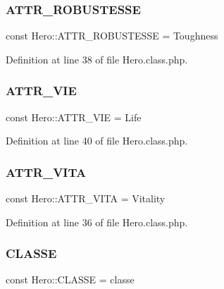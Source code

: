 \subsubsection{\texorpdfstring{A\+T\+T\+R\+\_\+\+R\+O\+B\+U\+S\+T\+E\+S\+SE}{ATTR\_ROBUSTESSE}}
{\footnotesize\ttfamily const Hero\+::\+A\+T\+T\+R\+\_\+\+R\+O\+B\+U\+S\+T\+E\+S\+SE = \textquotesingle{}Toughness\textquotesingle{}}



Definition at line 38 of file Hero.\+class.\+php.

\mbox{\label{class_hero_ac12926c2f7d9d0ad91ee3956de0e4471}} 
\subsubsection{\texorpdfstring{A\+T\+T\+R\+\_\+\+V\+IE}{ATTR\_VIE}}
{\footnotesize\ttfamily const Hero\+::\+A\+T\+T\+R\+\_\+\+V\+IE = \textquotesingle{}Life\textquotesingle{}}



Definition at line 40 of file Hero.\+class.\+php.

\mbox{\label{class_hero_a5d896e1773903e8496b01bff06bcdd62}} 
\subsubsection{\texorpdfstring{A\+T\+T\+R\+\_\+\+V\+I\+TA}{ATTR\_VITA}}
{\footnotesize\ttfamily const Hero\+::\+A\+T\+T\+R\+\_\+\+V\+I\+TA = \textquotesingle{}Vitality\textquotesingle{}}



Definition at line 36 of file Hero.\+class.\+php.

\mbox{\label{class_hero_a261b3cd95f444add0efb50d0fce447fb}} 
\subsubsection{\texorpdfstring{C\+L\+A\+S\+SE}{CLASSE}}
{\footnotesize\ttfamily const Hero\+::\+C\+L\+A\+S\+SE = \textquotesingle{}classe\textquotesingle{}}



